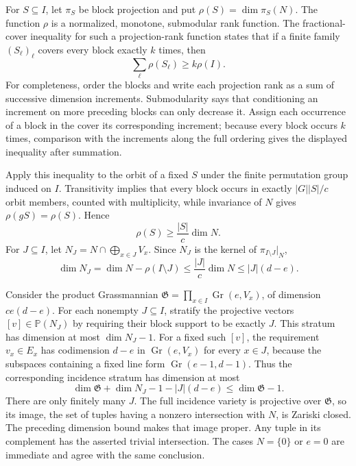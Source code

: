 For \(S\subseteq I\), let \(\pi_S\) be block projection and put \(\rho(S)=\dim\pi_S(N)\). The function \(\rho\) is a normalized, monotone, submodular rank function. The fractional-cover inequality for such a projection-rank function states that if a finite family \((S_\ell)_\ell\) covers every block exactly \(k\) times, then
\[
\sum_\ell\rho(S_\ell)\ge k\rho(I).
\]
For completeness, order the blocks and write each projection rank as a sum of successive dimension increments. Submodularity says that conditioning an increment on more preceding blocks can only decrease it. Assign each occurrence of a block in the cover its corresponding increment; because every block occurs \(k\) times, comparison with the increments along the full ordering gives the displayed inequality after summation.

Apply this inequality to the orbit of a fixed \(S\) under the finite permutation group induced on \(I\). Transitivity implies that every block occurs in exactly \(|G||S|/c\) orbit members, counted with multiplicity, while invariance of \(N\) gives \(\rho(gS)=\rho(S)\). Hence
\[
\rho(S)\ge\frac{|S|}{c}\dim N.
\]
For \(J\subseteq I\), let \(N_J=N\cap\bigoplus_{x\in J}V_x\). Since \(N_J\) is the kernel of \(\pi_{I\setminus J}|_N\),
\[
\dim N_J=\dim N-\rho(I\setminus J)\le\frac{|J|}{c}\dim N\le |J|(d-e).
\]

Consider the product Grassmannian \(\mathfrak G=\prod_{x\in I}\operatorname{Gr}(e,V_x)\), of dimension \(ce(d-e)\). For each nonempty \(J\subseteq I\), stratify the projective vectors \([v]\in\mathbb P(N_J)\) by requiring their block support to be exactly \(J\). This stratum has dimension at most \(\dim N_J-1\). For a fixed such \([v]\), the requirement \(v_x\in E_x\) has codimension \(d-e\) in \(\operatorname{Gr}(e,V_x)\) for every \(x\in J\), because the subspaces containing a fixed line form \(\operatorname{Gr}(e-1,d-1)\). Thus the corresponding incidence stratum has dimension at most
\[
\dim\mathfrak G+\dim N_J-1-|J|(d-e)\le\dim\mathfrak G-1.
\]
There are only finitely many \(J\). The full incidence variety is projective over \(\mathfrak G\), so its image, the set of tuples having a nonzero intersection with \(N\), is Zariski closed. The preceding dimension bound makes that image proper. Any tuple in its complement has the asserted trivial intersection. The cases \(N=\{0\}\) or \(e=0\) are immediate and agree with the same conclusion.
